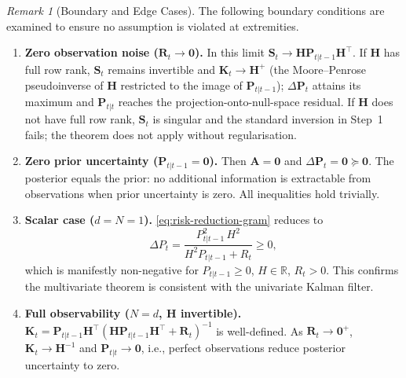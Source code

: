 \documentclass[12pt,openany]{book}
\numberwithin{equation}{chapter}
\theoremstyle{plain}
\theoremstyle{definition}
\theoremstyle{remark}
\newtheorem{remark}[theorem]{Remark}
\begin{document}
\begin{remark}[Boundary and Edge Cases]
\label{rem:risk-reduction-edge}
The following boundary conditions are examined to ensure no
assumption is violated at extremities.
\begin{enumerate}
  \item \textbf{Zero observation noise ($\mathbf{R}_t \to \mathbf{0}$).}
        In this limit $\mathbf{S}_t \to
        \mathbf{H}\mathbf{P}_{t|t-1}\mathbf{H}^\top$.
        If $\mathbf{H}$ has full row rank, $\mathbf{S}_t$ remains
        invertible and $\mathbf{K}_t \to
        \mathbf{H}^{+}$ (the Moore–Penrose pseudoinverse of
        $\mathbf{H}$ restricted to the image of
        $\mathbf{P}_{t|t-1}$); $\Delta\mathbf{P}_t$ attains its
        maximum and $\mathbf{P}_{t|t}$ reaches the
        projection-onto-null-space residual.
        If $\mathbf{H}$ does not have full row rank,
        $\mathbf{S}_t$ is singular and the standard inversion in
        Step~1 fails; the theorem does not apply without
        regularisation.

  \item \textbf{Zero prior uncertainty ($\mathbf{P}_{t|t-1} =
        \mathbf{0}$).}
        Then $\mathbf{A} = \mathbf{0}$ and
        $\Delta\mathbf{P}_t = \mathbf{0} \succeq \mathbf{0}$.
        The posterior equals the prior: no additional information
        is extractable from observations when prior uncertainty is
        zero.  All inequalities hold trivially.

  \item \textbf{Scalar case ($d = N = 1$).}
        \eqref{eq:risk-reduction-gram} reduces to
        \begin{equation}
          \Delta P_t
          = \frac{P_{t|t-1}^{2}\,H^{2}}{H^2 P_{t|t-1} + R_t}
          \geq 0,
          \label{eq:scalar-delta-p}
        \end{equation}
        which is manifestly non-negative for $P_{t|t-1} \geq 0$,
        $H \in \mathbb{R}$, $R_t > 0$.
        This confirms the multivariate theorem is consistent with
        the univariate Kalman filter.

  \item \textbf{Full observability ($N = d$, $\mathbf{H}$
        invertible).}
        $\mathbf{K}_t =
        \mathbf{P}_{t|t-1}\mathbf{H}^\top(\mathbf{H}
        \mathbf{P}_{t|t-1}\mathbf{H}^\top + \mathbf{R}_t)^{-1}$
        is well-defined.  As $\mathbf{R}_t \to \mathbf{0}^{+}$,
        $\mathbf{K}_t \to \mathbf{H}^{-1}$ and
        $\mathbf{P}_{t|t} \to \mathbf{0}$, i.e., perfect
        observations reduce posterior uncertainty to zero.


\end{enumerate}
\end{remark}
\end{document}
